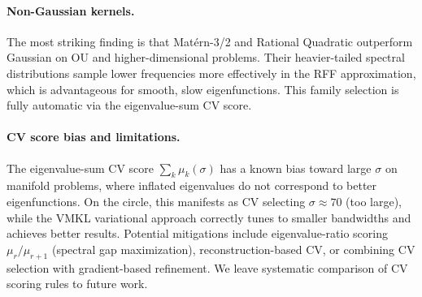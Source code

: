 \documentclass[11pt]{article}
\theoremstyle{remark}
\begin{document}
\paragraph{Non-Gaussian kernels.}
The most striking finding is that Mat\'ern-3/2 and Rational Quadratic outperform Gaussian on OU and higher-dimensional problems.
Their heavier-tailed spectral distributions sample lower frequencies more effectively in the RFF approximation, which is advantageous for smooth, slow eigenfunctions.
This family selection is fully automatic via the eigenvalue-sum CV score.

\paragraph{CV score bias and limitations.}
The eigenvalue-sum CV score $\sum_k \mu_k(\sigma)$ has a known bias toward large $\sigma$ on manifold problems, where inflated eigenvalues do not correspond to better eigenfunctions.
On the circle, this manifests as CV selecting $\sigma\approx70$ (too large), while the VMKL variational approach correctly tunes to smaller bandwidths and achieves better results.
Potential mitigations include eigenvalue-ratio scoring $\mu_r/\mu_{r+1}$ (spectral gap maximization), reconstruction-based CV, or combining CV selection with gradient-based refinement.
We leave systematic comparison of CV scoring rules to future work.
\end{document}
